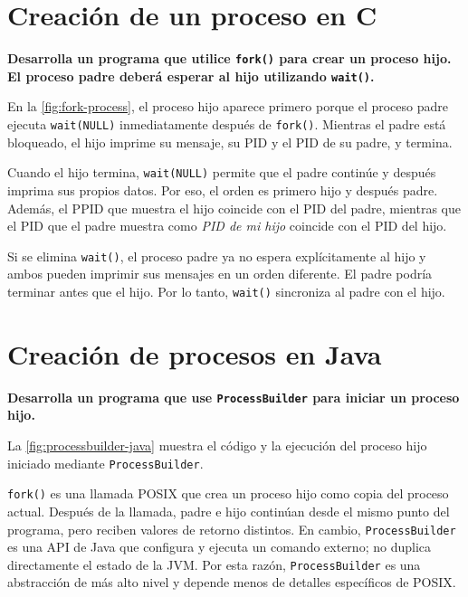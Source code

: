\documentclass[12pt,oneside]{template/liverpoolthesis}
\begin{document}


\chapter{Creación de un proceso en C}

\textbf{Desarrolla un programa que utilice \texttt{fork()} para crear un proceso hijo.
El proceso padre deberá esperar al hijo utilizando \texttt{wait()}.}


En la \autoref{fig:fork-process}, el proceso hijo aparece primero porque el proceso padre ejecuta
\texttt{wait(NULL)} inmediatamente después de \texttt{fork()}. Mientras el padre
está bloqueado, el hijo imprime su mensaje, su PID y el PID de su padre, y termina.

Cuando el hijo termina, \texttt{wait(NULL)} permite que el padre continúe y
después imprima sus propios datos. Por eso, el orden es
primero hijo y después padre. Además, el PPID que muestra el hijo coincide con el
PID del padre, mientras que el PID que el padre muestra como \textit{PID de mi
hijo} coincide con el PID del hijo.

Si se elimina \texttt{wait()}, el proceso padre ya no espera explícitamente al
hijo y ambos pueden imprimir sus mensajes en un orden diferente. El padre podría
terminar antes que el hijo.
Por lo
tanto, \texttt{wait()} sincroniza al padre con el hijo.



\chapter{Creación de procesos en Java}

\textbf{Desarrolla un programa que use \texttt{ProcessBuilder} para iniciar un proceso
hijo. }

La \autoref{fig:processbuilder-java} muestra el código y la ejecución del
proceso hijo iniciado mediante \texttt{ProcessBuilder}.

\texttt{fork()} es una llamada POSIX que crea un proceso hijo como copia del
proceso actual. Después de la llamada, padre e hijo continúan desde el mismo
punto del programa, pero reciben valores de retorno distintos. En cambio,
\texttt{ProcessBuilder} es una API de Java que configura y ejecuta un comando
externo; no duplica directamente el estado de la JVM. Por esta razón,
\texttt{ProcessBuilder} es una abstracción de más alto nivel y depende menos de
detalles específicos de POSIX.
\end{document}

